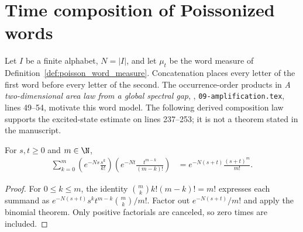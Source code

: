 \section{Time composition of Poissonized words}
\label{sec:poisson_word_semigroup}

Let $I$ be a finite alphabet, $N=|I|$, and let $\mu_t$ be the word measure
of Definition~\ref{def:poisson_word_measure}.  Concatenation places every
letter of the first word before every letter of the second.  The
occurrence-order products in
\emph{A two-dimensional area law from a global spectral gap},
\cite{OpenAI2026AreaLaw}, \texttt{09-amplification.tex}, lines 49--54,
motivate this word model.  The following derived composition law supports
the excited-state estimate on lines 237--253; it is not a theorem stated
in the manuscript.

\begin{lemma}
\label{lem:poisson_word_weight_convolution}
\leanok
{}
For $s,t\ge0$ and $m\in\N$,
\begin{align}
 \sum_{k=0}^{m}
   \left(e^{-Ns}\frac{s^k}{k!}\right)
   \left(e^{-Nt}\frac{t^{m-k}}{(m-k)!}\right)
 &=e^{-N(s+t)}\frac{(s+t)^m}{m!}.
 \label{eq:poisson_word_weight_convolution}
\end{align}
\end{lemma}
\begin{proof}
\leanok
For $0\le k\le m$, the identity
$\binom{m}{k}k!(m-k)!=m!$ expresses each summand as
$e^{-N(s+t)}s^kt^{m-k}\binom{m}{k}/m!$.
Factor out $e^{-N(s+t)}/m!$ and apply the binomial theorem.
Only positive factorials are canceled, so zero times are included.
\end{proof}

